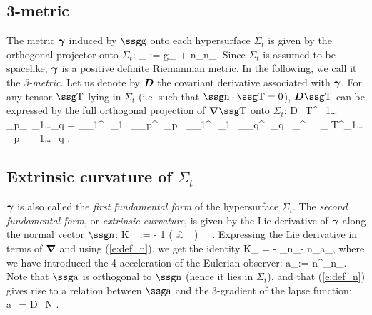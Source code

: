 \subsection{3-metric}

The metric $\mbox{\boldmath ${\gamma}$}$ induced by $\w{g}$ onto each hypersurface $\Sigma_t$
is given by the orthogonal projector onto $\Sigma_t$:
\be \label{e:def_3-metric}
	\gamma_{\alpha\beta} := g_{\alpha\beta} + n_\alpha n_\beta  .
\ee 
Since $\Sigma_t$ is assumed to be spacelike, $\mbox{\boldmath ${\gamma}$}$ is
a positive definite Riemannian metric. In the following, we
call it the {\em 3-metric}. 
Let us denote by $\mbox{\boldmath ${D}$}$ the covariant derivative
associated with $\mbox{\boldmath ${\gamma}$}$.
For any tensor $\w{T}$ lying in $\Sigma_t$ (i.e. such that
$\w{n}\cdot\w{T}=0$), $\wg{D}\w{T}$ can be expressed by
the full orthogonal projection of $\wg{\nabla}\w{T}$
onto $\Sigma_t$:
\be \label{e:nab_def}
D_\gamma T^{\alpha_1\ldots\alpha_p}_{\ \qquad\beta_1\ldots\beta_q}
		= \gamma_{\mu_1}^{\ \,\alpha_1} \, \cdots 
		 \gamma_{\mu_p}^{\ \,\alpha_p} \,
		  \gamma_{\beta_1}^{\ \,\nu_1} \, \cdots
		  \gamma_{\beta_q}^{\ \,\nu_q} \,
		  \gamma_\gamma^{\ \,\sigma} \, \nabla_\sigma
		  T^{\mu_1\ldots\mu_p}_{\ \qquad\nu_1\ldots\nu_q}  .		  	
\ee  

\subsection{Extrinsic curvature of $\Sigma_t$}

$\mbox{\boldmath ${\gamma}$}$ is also called the {\em first fundamental form}
of the hypersurface $\Sigma_t$. The {\em second fundamental form},
or {\em extrinsic curvature}, is given by the Lie derivative of
$\mbox{\boldmath ${\gamma}$}$ along the normal vector $\w{n}$:
\be \label{e:def_courb_extrins}
	K_{\alpha\beta} := - {1} \left( \pounds_{}\wg{\gamma}
		\right) _{\alpha\beta}  .
\ee
Expressing the Lie derivative in terms of $\mbox{\boldmath ${\nabla}$}$ 
and using (\ref{e:def_n}), we
get the identity
\be \label{e:K_grad_n}
	K_{\alpha\beta} = - \nabla_\alpha n_\beta - n_\alpha a_\beta  ,
\ee
where we have introduced the 4-acceleration of the Eulerian observer:
\be
	a_\alpha := n^\mu \nabla_\mu n_\alpha .
\ee 
Note that $\w{a}$ is orthogonal to $\w{n}$ (hence it lies in $\Sigma_t$),
and that (\ref{e:def_n}) gives rise to a relation between
$\w{a}$ and the 3-gradient of the lapse function:
\be \label{e:a_grad_N}
	a_\alpha = D_\alpha \ln N  .
\ee
{}


